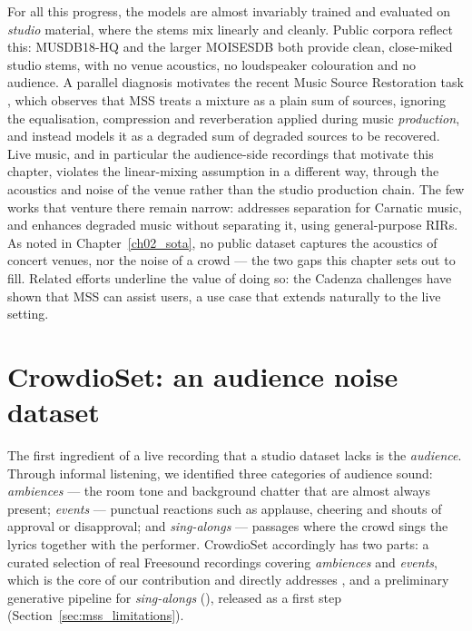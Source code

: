 For all this progress, the models are almost invariably trained and evaluated on
\emph{studio} material, where the stems mix linearly and cleanly. Public corpora
reflect this: MUSDB18-HQ \citep{rafii2019musdbhq} and the larger MOISESDB
\citep{pereira2023moisesdb} both provide clean, close-miked studio stems, with no
venue acoustics, no loudspeaker colouration and no audience. A parallel
diagnosis motivates the recent Music Source Restoration task
\citep{zang2025music}, which observes that \acrshort{MSS} treats a mixture as a
plain sum of sources, ignoring the equalisation, compression and reverberation
applied during music \emph{production}, and instead models it as a degraded sum
of degraded sources to be recovered. Live music, and in particular the
audience-side recordings that motivate this chapter, violates the linear-mixing
assumption in a different way, through the acoustics and noise of the venue
rather than the studio production chain. The few works that venture there remain
narrow: \citet{plaja-carnatic_separation} addresses separation for Carnatic
music, and \citet{kandpal2022musicenhancement} enhances degraded music without
separating it, using general-purpose \acrshort{RIR}s. As noted in
Chapter~\ref{ch02_sota}, no public dataset captures the acoustics of concert
venues, nor the noise of a crowd --- the two gaps this chapter sets out to fill.
Related efforts underline the value of doing so: the Cadenza challenges
\citep{roa2025first} have shown that \acrshort{MSS} can assist  users,
a use case that extends naturally to the live setting.

\section{CrowdioSet: an audience noise dataset}
\label{sec:crowdioset}

The first ingredient of a live recording that a studio dataset lacks is the
\emph{audience}. Through informal listening, we identified three categories of audience sound: \emph{ambiences} --- the
room tone and background chatter that are almost always present; \emph{events}
--- punctual reactions such as applause, cheering and shouts of approval or
disapproval; and \emph{sing-alongs} --- passages where the crowd sings the lyrics
together with the performer. CrowdioSet accordingly has two parts: a curated
selection of real Freesound recordings covering \emph{ambiences} and
\emph{events}, which is the core of our contribution and directly addresses
, and a preliminary generative pipeline for \emph{sing-alongs}
(), released as a first step (Section~\ref{sec:mss_limitations}).

